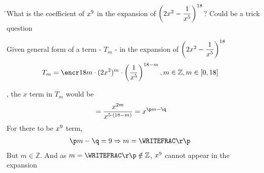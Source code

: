 



\ADD\vbone\vbtwo\p
\MULTIPLY\vbfour\vbtwo\q
\ADD\vbthree\q\r

\question[3] What is the coefficient of $x^{9}$ in the expansion of 
$\left( 2x^{2} - \dfrac{1}{x^{5}}\right)^{18}$? Could be a trick question


\watchout

\ifprintanswers
\fi 

\begin{solution}[\halfpage]
  Given general form of a term - $T_m$ - in the expansion of 
  $\left( 2x^{2} - \dfrac{1}{x^{5}}\right)^{18}$ 
  \begin{align}
    T_m &= \encr\vbfour{m}\cdot(2x^{\vbone})^{m}\cdot\left(\dfrac{1}{x^{\vbtwo}}\right)^{\vbfour - m}
    , m \in\mathbb{Z}, m\in [0,\vbfour]
  \end{align}
  
  , the $x$ term in $T_m$ would be 
  \begin{align}
    &= \dfrac{x^{\vbone m}}{x^{\vbtwo\cdot(\vbfour - m)}} = x^{\p m - \q}
  \end{align}
  For there to be $x^{9}$ term,
  \begin{align}
    \p m - \q &= \vbthree\Rightarrow m = \WRITEFRAC\r\p
  \end{align}
  But $m\in\mathbb{Z}$. And as $m = \WRITEFRAC\r\p \notin\mathbb{Z}$, 
  $x^{9}$ cannot appear in the expansion
\end{solution}


